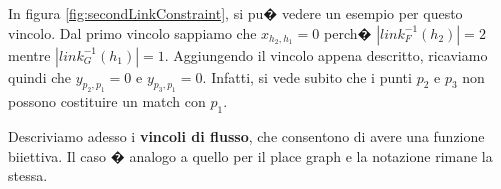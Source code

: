 \begin{itemize}
\begin{figure*}[th]
\begin{tikzpicture}
	\end{tikzpicture}
	\caption{Esempio per il secondo vincolo. \label{fig:secondLinkConstraint}}
	\end{figure*}
	
	In figura \ref{fig:secondLinkConstraint}, si pu� vedere un esempio per questo vincolo. Dal primo vincolo sappiamo che $x_{h_2,h_1} = 0$ perch� 
	$|link_F^{-1}(h_2)| = 2$ mentre $|link_G^{-1}(h_1)| = 1$. Aggiungendo il vincolo appena descritto, ricaviamo quindi che $y_{p_2,p_1} = 0$ e $y_{p_3,p_1} = 0$. Infatti, si vede subito che i punti $p_2$ e $p_3$ non possono costituire un match con $p_1$.
\end{itemize}

Descriviamo adesso i \textbf{vincoli di flusso}, che consentono di avere una funzione biiettiva. Il caso � analogo a quello per il place graph e la notazione rimane la stessa.

